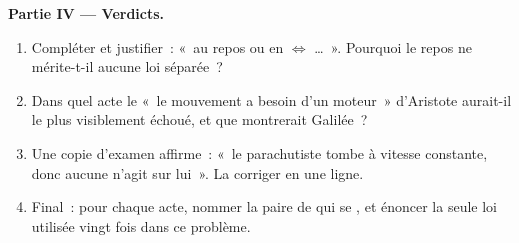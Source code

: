 \begin{problem}
\medskip
\noindent\textbf{Partie IV --- Verdicts.}
\begin{enumerate}[resume]
  \item Compléter et justifier~: «~au repos ou en
         $\iff$ \dots~».
        Pourquoi le repos ne mérite-t-il aucune loi séparée~?
  \item Dans quel acte le «~le mouvement a besoin d'un moteur~»
        d'Aristote aurait-il le plus visiblement échoué, et que
        montrerait Galilée~?
  \item Une copie d'examen affirme~: «~le parachutiste tombe à vitesse
        constante, donc aucune  n'agit sur lui~». La
        corriger en une ligne.
  \item Final~: pour chaque acte, nommer la paire de
         qui se , et
        énoncer la seule loi utilisée vingt fois dans ce problème.
\end{enumerate}
\end{problem}
